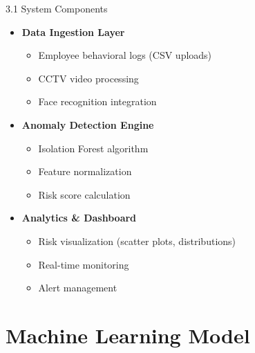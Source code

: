 \documentclass[aspectratio=169]{beamer}
\begin{document}
\begin{frame}{3.1 System Components}

\begin{itemize}
    \item \textbf{Data Ingestion Layer}
    \begin{itemize}
        \item Employee behavioral logs (CSV uploads)
        \item CCTV video processing
        \item Face recognition integration
    \end{itemize}
    \vspace{0.3cm}
    \item \textbf{Anomaly Detection Engine}
    \begin{itemize}
        \item Isolation Forest algorithm
        \item Feature normalization
        \item Risk score calculation
    \end{itemize}
    \vspace{0.3cm}
    \item \textbf{Analytics \& Dashboard}
    \begin{itemize}
        \item Risk visualization (scatter plots, distributions)
        \item Real-time monitoring
        \item Alert management
    \end{itemize}
\end{itemize}

\end{frame}


\section{Machine Learning Model}
\end{document}
